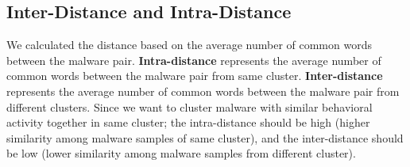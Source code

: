 \subsection{Inter-Distance and Intra-Distance}
\label{sub:Inter-Distance and Intra-Distance}
We calculated the distance based on the average number of common words between the malware pair.
\textbf{Intra-distance} represents the average number of common words between the malware pair from same cluster.
\textbf{Inter-distance} represents the average number of common words between the malware pair from different clusters.
Since we want to cluster malware with similar behavioral activity together in same cluster; the intra-distance should be high (higher similarity among malware samples of same cluster), and the inter-distance should be low (lower similarity among malware samples from different cluster).
\\

